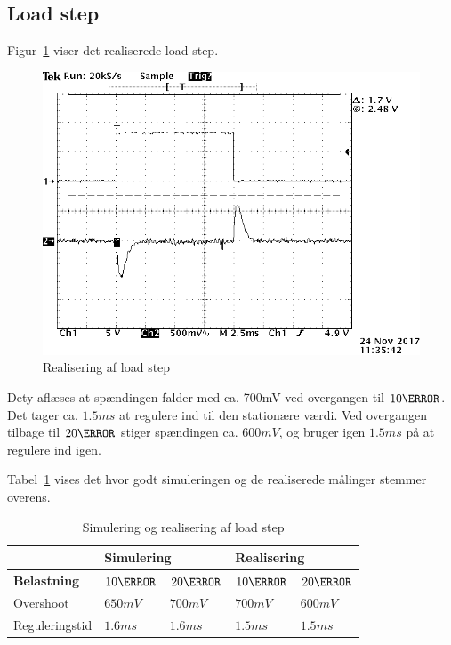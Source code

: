 \subsection{Load step}
Figur~\ref{fig:belastningsamlet} viser det realiserede load step.
\begin{figure}[H]
	\center
	\includegraphics[max width=0.7\linewidth]{../dokumentation/tex/2iteration/billeder/Realisering/belastningsamlet.png}
	\caption{Realisering af load step}
	\label{fig:belastningsamlet}
\end{figure}
Dety aflæses at spændingen falder med ca. 700mV ved overgangen til $10\ohm$. Det tager ca. $1.5ms$ at regulere ind til den stationære værdi. Ved overgangen tilbage til $20\ohm$ stiger spændingen ca. $600mV$, og bruger igen $1.5ms$ på at regulere ind igen.

Tabel~\ref{tab:Loadstep} vises det hvor godt simuleringen og de realiserede målinger stemmer overens.
\begin{table}[H] 			
	\centering
	\begin{tabularx}{\textwidth}{|X|l|l|l|l|}
		\hline
		& \multicolumn{2}{|l|}{\textbf{Simulering}} & \multicolumn{2}{|l|}{\textbf{Realisering}} \\ \hline
		\textbf{Belastning} & $10\ohm$ & $20\ohm$ & $10\ohm$ & $20\ohm$ \\ \hline
		Overshoot & $650mV$ & $700mV$ & $700mV$ & $600mV$  \\ \hline
		Reguleringstid & $1.6ms$ & $1.6ms$ & $1.5ms$ & $1.5ms$ \\ \hline
	\end{tabularx}
	\caption{Simulering og realisering af load step}
	\label{tab:Loadstep}
\end{table}